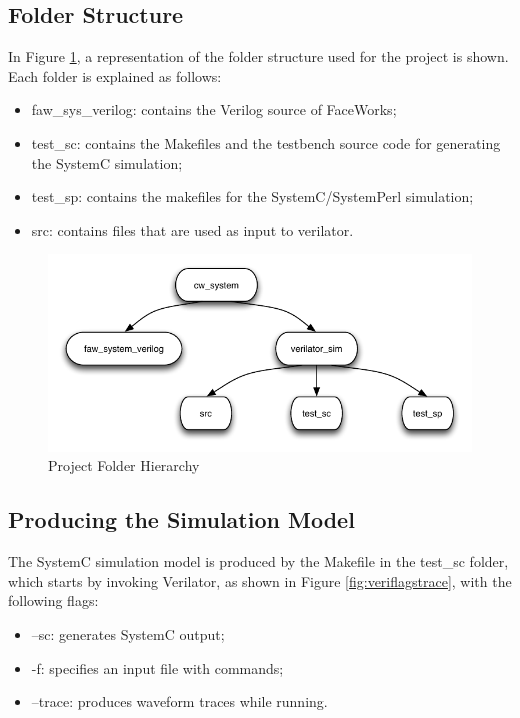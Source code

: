 \documentclass[defaultstyle,10pt,master,Helvetica]{thesis}
\begin{document}
\subsection{Folder Structure}

In Figure \ref{fig:foldhier}, a representation of the folder structure used for the project is shown. Each folder is explained as follows:

\begin{itemize}
\item faw\_sys\_verilog: contains the Verilog source of FaceWorks;
\item test\_sc: contains the Makefiles and the testbench source code for generating the SystemC simulation;
\item test\_sp: contains the makefiles for the SystemC/SystemPerl simulation;
\item src: contains files that are used as input to verilator.
\end{itemize}

\begin{figure}[h]
  \centering
      \includegraphics[scale=0.75]{Diagrams/Pastas.pdf}
  \caption{Project Folder Hierarchy}\label{fig:foldhier}
\end{figure}

\subsection{Producing the Simulation Model} 
The SystemC simulation model is produced by the Makefile in the test\_sc folder, which starts by invoking Verilator, as shown in Figure \ref{fig:veriflagstrace}, with the following flags:
\begin{itemize}
\item --sc: generates SystemC output;
\item -f: specifies an input file with commands;
\item --trace: produces waveform traces while running.
\end{itemize}
\end{document}
